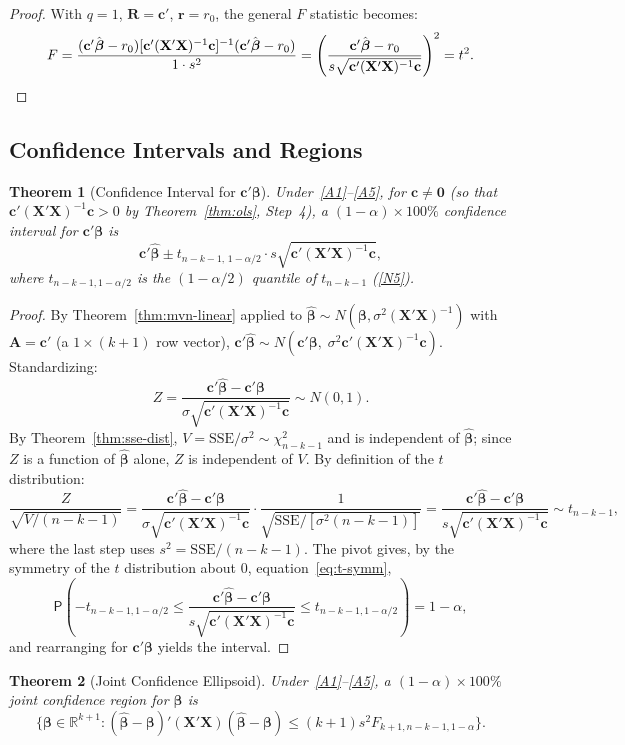 \documentclass[14pt]{extarticle}
\theoremstyle{plain}
\newtheorem{theorem}{Theorem}[section]
\theoremstyle{definition}
\theoremstyle{remark}
\newcommand\prb{\mathsf{P}}
\newcommand{\SSE}{\mathrm{SSE}}
\newcommand{\bX}{\mathbf{X}}
\def\bb{\boldsymbol{\beta}}
\newcommand{\bR}{\mathbf{R}}
\newcommand{\br}{\mathbf{r}}
\def\bc{\mathbf{c}}
\newcommand{\bzero}{\mathbf{0}}
\newcommand{\bA}{\mathbf{A}}
\newcommand{\Real}{\mathbb{R}}
\begin{document}
\begin{proof}
With $q = 1$, $\bR = \bc'$, $\br = r_0$, the general $F$ statistic becomes:
\[
F = \frac{(\bc'\hat{\bb} - r_0)[\bc'(\bX'\bX)^{-1}\bc]^{-1}(\bc'\hat{\bb} - r_0)}{1 \cdot s^2} = \left(\frac{\bc'\hat{\bb} - r_0}{s\sqrt{\bc'(\bX'\bX)^{-1}\bc}}\right)^2 = t^2. \qedhere
\]
\end{proof}

\subsection{Confidence Intervals and Regions}

\begin{theorem}[Confidence Interval for $\bc'\bb$]\label{thm:ci}
Under~\ref{A1}--\ref{A5}, for $\bc \neq \bzero$ (so that $\bc'(\bX'\bX)^{-1}\bc > 0$ by Theorem~\ref{thm:ols}, Step~4), a $(1-\alpha) \times 100\%$ confidence interval for $\bc'\bb$ is
\begin{equation}
\bc'\hat{\bb} \pm t_{n-k-1,\,1-\alpha/2} \cdot s\sqrt{\bc'(\bX'\bX)^{-1}\bc},
\end{equation}
where $t_{n-k-1,1-\alpha/2}$ is the $(1-\alpha/2)$ quantile of $t_{n-k-1}$ (\ref{N5}).
\end{theorem}

\begin{proof}
By Theorem~\ref{thm:mvn-linear} applied to $\hat{\bb} \sim N(\bb, \sigma^2(\bX'\bX)^{-1})$ with $\bA = \bc'$ (a $1 \times (k+1)$ row vector), $\bc'\hat{\bb} \sim N(\bc'\bb,\; \sigma^2\bc'(\bX'\bX)^{-1}\bc)$. Standardizing:
\[
Z = \frac{\bc'\hat{\bb} - \bc'\bb}{\sigma\sqrt{\bc'(\bX'\bX)^{-1}\bc}} \sim N(0, 1).
\]
By Theorem~\ref{thm:sse-dist}, $V = \SSE/\sigma^2 \sim \chi^2_{n-k-1}$ and is independent of $\hat{\bb}$; since $Z$ is a function of $\hat{\bb}$ alone, $Z$ is independent of $V$. By definition of the $t$ distribution:
\[
\frac{Z}{\sqrt{V/(n-k-1)}} = \frac{\bc'\hat{\bb} - \bc'\bb}{\sigma\sqrt{\bc'(\bX'\bX)^{-1}\bc}} \cdot \frac{1}{\sqrt{\SSE/[\sigma^2(n-k-1)]}} = \frac{\bc'\hat{\bb} - \bc'\bb}{s\sqrt{\bc'(\bX'\bX)^{-1}\bc}} \sim t_{n-k-1},
\]
where the last step uses $s^2 = \SSE/(n-k-1)$. The pivot gives, by the symmetry of the $t$ distribution about $0$, equation~\eqref{eq:t-symm},
\[
\prb\!\left(-t_{n-k-1,1-\alpha/2} \leqslant \frac{\bc'\hat{\bb} - \bc'\bb}{s\sqrt{\bc'(\bX'\bX)^{-1}\bc}} \leqslant t_{n-k-1,1-\alpha/2}\right) = 1 - \alpha,
\]
and rearranging for $\bc'\bb$ yields the interval.
\end{proof}

\begin{theorem}[Joint Confidence Ellipsoid]\label{thm:ellipsoid}
Under~\ref{A1}--\ref{A5}, a $(1-\alpha) \times 100\%$ joint confidence region for $\bb$ is
\begin{equation}
\bigl\{\bb \in \Real^{k+1} : (\hat{\bb} - \bb)'(\bX'\bX)(\hat{\bb} - \bb) \leqslant (k+1) s^2 F_{k+1, n-k-1, 1-\alpha}\bigr\}.
\end{equation}
\end{theorem}
\end{document}
